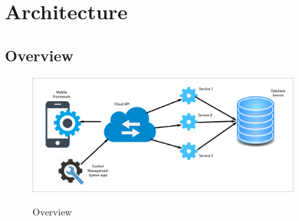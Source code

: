 \chapter{Architecture}

\section{Overview}

\begin{figure}[h]
    \caption{Overview}
    \centering
    \includegraphics[width=100mm]{images/overview}
    \label{fig:label}
\end{figure}




